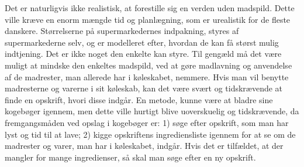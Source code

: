 Det er naturligvis ikke realistisk, at forestille sig en verden uden madspild. Dette ville kræve en enorm mængde tid og planlægning, som er urealistik for de fleste danskere. Størrelserne på supermarkedernes indpakning, styres af supermarkederne selv, og er modelleret efter, hvordan de kan få størst mulig indtjening. Det er ikke noget den enkelte kan styre. Til gengæld må det være muligt at mindske den enkeltes madspild, ved at gøre madlavning og anvendelse af de madrester, man allerede har i køleskabet, nemmere. Hvis man vil benytte madresterne og varerne i sit køleskab, kan det være svært og tidskrævende at finde en opskrift, hvori disse indgår. En metode, kunne være at bladre sine kogebøger igennem, men dette ville hurtigt blive uoverskuelig og tidskrævende, da fremgangsmåden ved opslag i kogebøger er: 1) søge efter opskrift, som man har lyst og tid til at lave; 2) kigge opskriftens ingrediensliste igennem for at se om de madrester og varer, man har i køleskabet, indgår. Hvis det er tilfældet, at der mangler for mange ingredienser, så skal man søge efter en ny opskrift.
